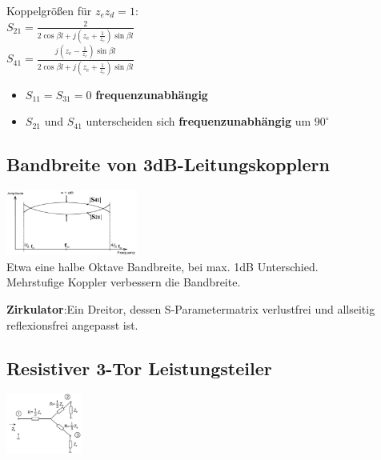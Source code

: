\documentclass[english]{latex4ei/latex4ei_sheet}
\begin{document}
\begin{sectionbox}
	\begin{emphbox}
		Koppelgrößen für $z_e z_d = 1$:\\
		\vspace{1em}
		$S_{21}=\frac{2}{2 \cos \beta l+j\left(z_{e}+\frac{1}{z_{e}}\right) \sin \beta l}$\\
		$S_{41}=\frac{j\left(z_{e}-\frac{1}{z_{e}}\right) \sin \beta l}{2 \cos \beta l+j\left(z_{e}+\frac{1}{z_{e}}\right) \sin \beta l}$
		\begin{itemize}
			\item $S_{11} = S_{31} = 0$ \textbf{frequenzunabhängig}
			\item $S_{21}$ und $S_{41}$ unterscheiden sich \textbf{frequenzunabhängig} um $90^\circ$
		\end{itemize}
	\end{emphbox}
\end{sectionbox}
\begin{sectionbox}
	\subsection{Bandbreite von 3dB-Leitungskopplern}
	\includegraphics[width = 4.3cm]{./img/leitungskoppler_bb.png}\\
	Etwa eine halbe Oktave Bandbreite, bei max. 1dB Unterschied.\\
	Mehrstufige Koppler verbessern die Bandbreite.
\end{sectionbox}
\begin{sectionbox}
	\textbf{Zirkulator}:Ein Dreitor, dessen S-Parametermatrix verlustfrei und allseitig reflexionsfrei angepasst ist.
\end{sectionbox}

\begin{sectionbox}
	\subsection{Resistiver 3-Tor Leistungsteiler}
	\begin{center}\includegraphics[width = 2.5cm]{./img/res-3tor.png}
	\end{center}
\end{sectionbox}
\end{document}
